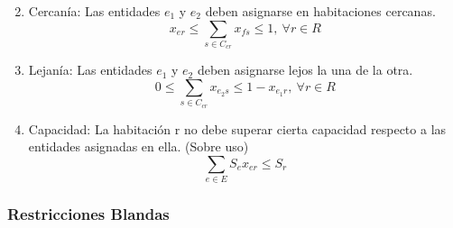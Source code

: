 \documentclass[letter, 10pt]{article}
\begin{document}
\begin{enumerate}
\begin{equation}
    \end{equation}
    \item Cercan\'ia: Las entidades $e_1$ y $e_2$ deben asignarse en habitaciones cercanas.
    \begin{equation}
        x_{er} \leq \sum_{s \in C_{cr} } x_{fs} \leq 1, \ \forall r \in R 
    \end{equation}
    \item Lejan\'ia: Las entidades $e_1$ y $e_2$ deben asignarse lejos la una de la otra.
    \begin{equation}
        0 \leq \sum_{s \in C_{cr} } x_{e_2s} \leq 1 - x_{e_1r}, \ \forall r \in R 
    \end{equation}
    \item Capacidad: La habitaci\'on r no debe superar cierta capacidad respecto a las entidades asignadas en ella. (Sobre uso)
    \begin{equation}
        \sum_{e \in E } S_{e}x_{er} \leq S_{r}
    \end{equation}
\end{enumerate}

\subsubsection{Restricciones Blandas}
\end{document}
